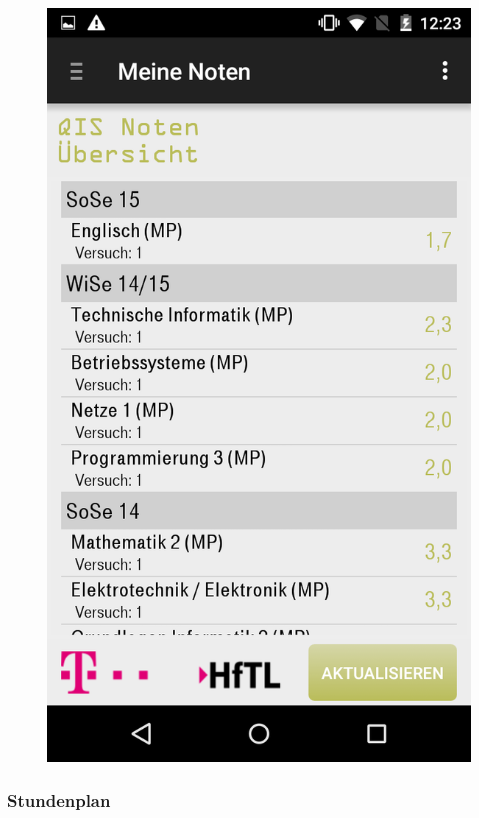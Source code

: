 \begin{figure}[H]
	\centering
	\includegraphics[scale=0.35]{03_Bedienungsanleitung/img/noten.png}
\end{figure}

\newpage

\subsubsection{Stundenplan}

